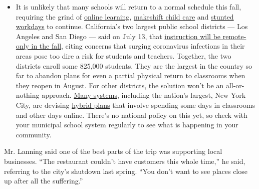 \begin{itemize}
  \begin{itemize}
  \tightlist
  \item
    It is unlikely that many schools will return to a normal schedule
    this fall, requiring the grind of
    \href{https://www.nytimes3xbfgragh.onion/2020/06/05/us/coronavirus-education-lost-learning.html?action=click\&pgtype=Article\&state=default\&region=MAIN_CONTENT_3\&context=storylines_faq}{online
    learning},
    \href{https://www.nytimes3xbfgragh.onion/2020/05/29/us/coronavirus-child-care-centers.html?action=click\&pgtype=Article\&state=default\&region=MAIN_CONTENT_3\&context=storylines_faq}{makeshift
    child care} and
    \href{https://www.nytimes3xbfgragh.onion/2020/06/03/business/economy/coronavirus-working-women.html?action=click\&pgtype=Article\&state=default\&region=MAIN_CONTENT_3\&context=storylines_faq}{stunted
    workdays} to continue. California's two largest public school
    districts --- Los Angeles and San Diego --- said on July 13, that
    \href{https://www.nytimes3xbfgragh.onion/2020/07/13/us/lausd-san-diego-school-reopening.html?action=click\&pgtype=Article\&state=default\&region=MAIN_CONTENT_3\&context=storylines_faq}{instruction
    will be remote-only in the fall}, citing concerns that surging
    coronavirus infections in their areas pose too dire a risk for
    students and teachers. Together, the two districts enroll some
    825,000 students. They are the largest in the country so far to
    abandon plans for even a partial physical return to classrooms when
    they reopen in August. For other districts, the solution won't be an
    all-or-nothing approach.
    \href{https://bioethics.jhu.edu/research-and-outreach/projects/eschool-initiative/school-policy-tracker/}{Many
    systems}, including the nation's largest, New York City, are
    devising
    \href{https://www.nytimes3xbfgragh.onion/2020/06/26/us/coronavirus-schools-reopen-fall.html?action=click\&pgtype=Article\&state=default\&region=MAIN_CONTENT_3\&context=storylines_faq}{hybrid
    plans} that involve spending some days in classrooms and other days
    online. There's no national policy on this yet, so check with your
    municipal school system regularly to see what is happening in your
    community.
  \end{itemize}
\end{itemize}

Mr. Lanning said one of the best parts of the trip was supporting local
businesses. ``The restaurant couldn't have customers this whole time,''
he said, referring to the city's shutdown last spring. ``You don't want
to see places close up after all the suffering.''

